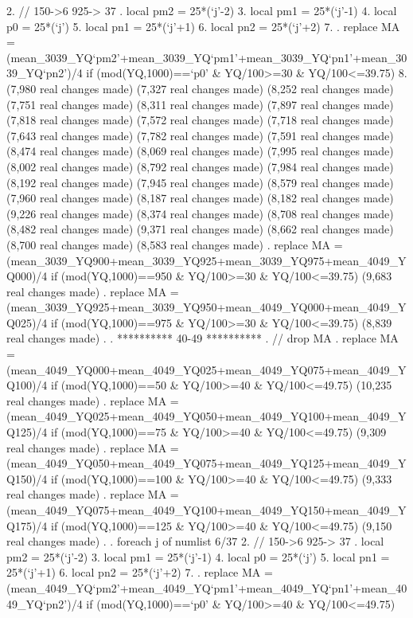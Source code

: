   2.         // 150->6 925-> 37
.         local pm2 = 25*(`j'-2)
  3.         local pm1 = 25*(`j'-1)
  4.         local p0 = 25*(`j')
  5.         local pn1 = 25*(`j'+1)
  6.         local pn2 = 25*(`j'+2)
  7. 
.         replace MA = (mean_3039_YQ`pm2'+mean_3039_YQ`pm1'+mean_3039_YQ`pn1'+mean_3039_YQ`pn2')/4 if (mod(YQ,1000)==`p0' \& YQ/100>=30 \& YQ/100<=39.75)
  8. {\rbr}
(7,980 real changes made)
(7,327 real changes made)
(8,252 real changes made)
(7,751 real changes made)
(8,311 real changes made)
(7,897 real changes made)
(7,818 real changes made)
(7,572 real changes made)
(7,718 real changes made)
(7,643 real changes made)
(7,782 real changes made)
(7,591 real changes made)
(8,474 real changes made)
(8,069 real changes made)
(7,995 real changes made)
(8,002 real changes made)
(8,792 real changes made)
(7,984 real changes made)
(8,192 real changes made)
(7,945 real changes made)
(8,579 real changes made)
(7,960 real changes made)
(8,187 real changes made)
(8,182 real changes made)
(9,226 real changes made)
(8,374 real changes made)
(8,708 real changes made)
(8,482 real changes made)
(9,371 real changes made)
(8,662 real changes made)
(8,700 real changes made)
(8,583 real changes made)
{\smallskip}
. replace MA = (mean_3039_YQ900+mean_3039_YQ925+mean_3039_YQ975+mean_4049_YQ000)/4 if (mod(YQ,1000)==950 \& YQ/100>=30 \& YQ/100<=39.75)
(9,683 real changes made)
{\smallskip}
. replace MA = (mean_3039_YQ925+mean_3039_YQ950+mean_4049_YQ000+mean_4049_YQ025)/4 if (mod(YQ,1000)==975 \& YQ/100>=30 \& YQ/100<=39.75)
(8,839 real changes made)
{\smallskip}
. 
. **********  40-49 **********
. // drop MA
. replace MA = (mean_4049_YQ000+mean_4049_YQ025+mean_4049_YQ075+mean_4049_YQ100)/4 if (mod(YQ,1000)==50 \& YQ/100>=40 \& YQ/100<=49.75)
(10,235 real changes made)
{\smallskip}
. replace MA = (mean_4049_YQ025+mean_4049_YQ050+mean_4049_YQ100+mean_4049_YQ125)/4 if (mod(YQ,1000)==75 \& YQ/100>=40 \& YQ/100<=49.75)
(9,309 real changes made)
{\smallskip}
. replace MA = (mean_4049_YQ050+mean_4049_YQ075+mean_4049_YQ125+mean_4049_YQ150)/4 if (mod(YQ,1000)==100 \& YQ/100>=40 \& YQ/100<=49.75)
(9,333 real changes made)
{\smallskip}
. replace MA = (mean_4049_YQ075+mean_4049_YQ100+mean_4049_YQ150+mean_4049_YQ175)/4 if (mod(YQ,1000)==125 \& YQ/100>=40 \& YQ/100<=49.75)
(9,150 real changes made)
{\smallskip}
. 
. foreach j of numlist 6/37{\lbr}
  2.         // 150->6 925-> 37
.         local pm2 = 25*(`j'-2)
  3.         local pm1 = 25*(`j'-1)
  4.         local p0 = 25*(`j')
  5.         local pn1 = 25*(`j'+1)
  6.         local pn2 = 25*(`j'+2)
  7. 
.         replace MA = (mean_4049_YQ`pm2'+mean_4049_YQ`pm1'+mean_4049_YQ`pn1'+mean_4049_YQ`pn2')/4 if (mod(YQ,1000)==`p0' \& YQ/100>=40 \& YQ/100<=49.75)
